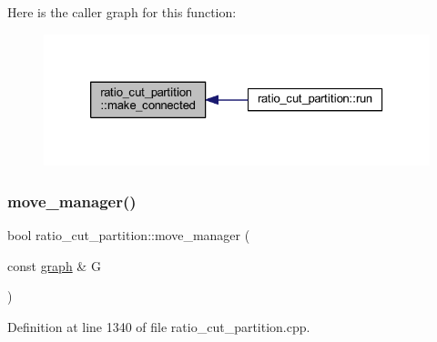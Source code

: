 Here is the caller graph for this function\+:\nopagebreak
\begin{figure}[H]
\begin{center}
\leavevmode
\includegraphics[width=326pt]{classratio__cut__partition_a46dba3eabbf31ce9d3545ba67fba1b62_icgraph}
\end{center}
\end{figure}
\mbox{\label{classratio__cut__partition_a16997844577ee3284a2b6fddbbea8c37}} 
\subsubsection{\texorpdfstring{move\+\_\+manager()}{move\_manager()}}
{\footnotesize\ttfamily bool ratio\+\_\+cut\+\_\+partition\+::move\+\_\+manager (\begin{DoxyParamCaption}\item[{const \mbox{\hyperlink{classgraph}{graph}} \&}]{G }\end{DoxyParamCaption})\hspace{0.3cm}{\ttfamily [protected]}}



Definition at line 1340 of file ratio\+\_\+cut\+\_\+partition.\+cpp.


